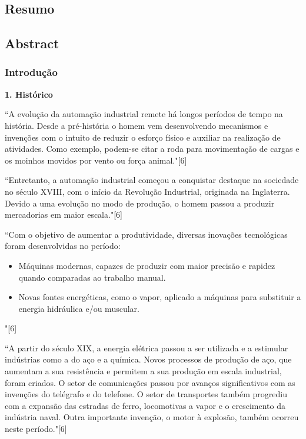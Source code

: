 \documentclass[a4paper, 12pt]{article}
\begin{document}
\begin{center}
\part*{Resumo}
\end{center}

\begin{center}
\part*{Abstract}
\end{center}

\section{Introdução}

\textbf{1. Histórico}

``A evolução da automação industrial remete há longos períodos de tempo
na história. Desde a pré-história o homem vem desenvolvendo mecanismos
e invenções com o intuito de reduzir o esforço físico e auxiliar na realização
de atividades. Como exemplo, podem-se citar a roda para movimentação de
cargas e os moinhos movidos por vento ou força animal."[6]

``Entretanto, a automação industrial começou a conquistar destaque na sociedade
no século XVIII, com o início da Revolução Industrial, originada na Inglaterra.
Devido a uma evolução no modo de produção, o homem passou a produzir
mercadorias em maior escala."[6]

``Com o objetivo de aumentar a produtividade, diversas inovações tecnológicas
foram desenvolvidas no período:
\begin{itemize}
	\item Máquinas modernas, capazes de produzir com maior precisão e rapidez
				quando comparadas ao trabalho manual.
	\item Novas fontes energéticas, como o vapor, aplicado a máquinas para 
				substituir a energia hidráulica e/ou muscular.
\end{itemize}
"[6]

``A partir do século XIX, a energia elétrica passou a ser utilizada e a estimular
indústrias como a do aço e a química. Novos processos de produção de aço, que
aumentam a sua resistência e permitem a sua produção em escala industrial,
foram criados. O setor de comunicações passou por avanços significativos
com as invenções do telégrafo e do telefone. O setor de transportes também
progrediu com a expansão das estradas de ferro, locomotivas a vapor e o
crescimento da indústria naval. Outra importante invenção, o motor à explosão,
também ocorreu neste período."[6]
\end{document}
